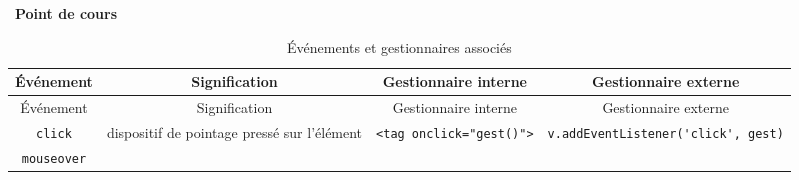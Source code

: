 \documentclass[
  11pt,
]{article}
\newcommand{\passthrough}[1]{#1}
\newcounter{cours}
\newenvironment{cours}[1]
{\par \medskip   \addtocounter{cours}{1} \noindent  
\begin{bclogo}[arrondi =0.1,  ombre = true, barre=none, logo=\bcbook, marge=4]{~\textbf{Point de cours} \textbf{\thecours} {\itshape #1} }  \par}
{
\end{bclogo}
 \par \bigskip }
\begin{document}
\begin{cours}{}
\begin{longtable}[]{@{}cccc@{}}
\caption{Événements et gestionnaires associés}\tabularnewline
\toprule
\begin{minipage}[b]{0.22\columnwidth}\centering
Événement\strut
\end{minipage} & \begin{minipage}[b]{0.22\columnwidth}\centering
Signification\strut
\end{minipage} & \begin{minipage}[b]{0.22\columnwidth}\centering
Gestionnaire interne\strut
\end{minipage} & \begin{minipage}[b]{0.22\columnwidth}\centering
Gestionnaire externe\strut
\end{minipage}\tabularnewline
\midrule
\endfirsthead
\toprule
\begin{minipage}[b]{0.22\columnwidth}\centering
Événement\strut
\end{minipage} & \begin{minipage}[b]{0.22\columnwidth}\centering
Signification\strut
\end{minipage} & \begin{minipage}[b]{0.22\columnwidth}\centering
Gestionnaire interne\strut
\end{minipage} & \begin{minipage}[b]{0.22\columnwidth}\centering
Gestionnaire externe\strut
\end{minipage}\tabularnewline
\midrule
\endhead
\begin{minipage}[t]{0.22\columnwidth}\centering
\passthrough{\lstinline!click!}\strut
\end{minipage} & \begin{minipage}[t]{0.22\columnwidth}\centering
dispositif de pointage pressé sur l'élément\strut
\end{minipage} & \begin{minipage}[t]{0.22\columnwidth}\centering
\passthrough{\lstinline!<tag onclick="gest()">!}\strut
\end{minipage} & \begin{minipage}[t]{0.22\columnwidth}\centering
\passthrough{\lstinline!v.addEventListener('click', gest)!}\strut
\end{minipage}\tabularnewline
\begin{minipage}[t]{0.22\columnwidth}\centering
\passthrough{\lstinline!mouseover!}\strut
\end{minipage} & \begin{minipage}[t]{0.22\columnwidth}\centering

\end{minipage}
\end{longtable}
\end{cours}
\end{document}
